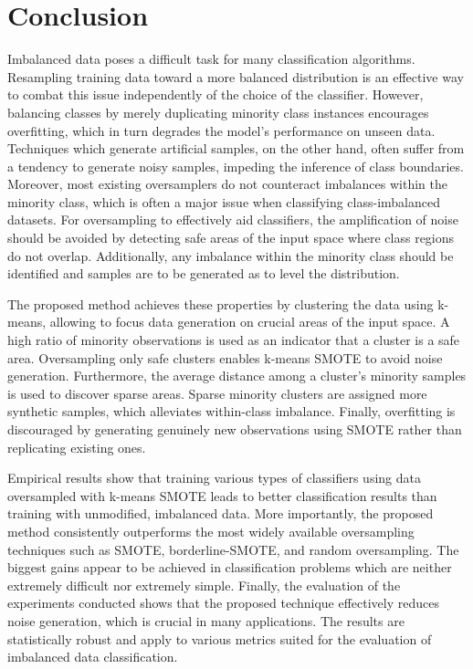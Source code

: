 \documentclass[sort&compress]{elsarticle}
\begin{document}
\section{Conclusion}
\label{sec:conclusion}
Imbalanced data poses a difficult task for many classification algorithms. Resampling training data toward a more balanced distribution is an effective way to combat this issue independently of the choice of the classifier. However, balancing classes by merely duplicating minority class instances encourages overfitting, which in turn degrades the model's performance on unseen data. Techniques which generate artificial samples, on the other hand, often suffer from a tendency to generate noisy samples, impeding the inference of class boundaries. Moreover, most existing oversamplers do not counteract imbalances within the minority class, which is often a major issue when classifying class-imbalanced datasets. For oversampling to effectively aid classifiers, the amplification of noise should be avoided by detecting safe areas of the input space where class regions do not overlap. Additionally, any imbalance within the minority class should be identified and samples are to be generated as to level the distribution.

The proposed method achieves these properties by clustering the data using k-means, allowing to focus data generation on crucial areas of the input space. A high ratio of minority observations is used as an indicator that a cluster is a safe area. Oversampling only safe clusters enables k-means \ac{SMOTE} to avoid noise generation. Furthermore, the average distance among a cluster's minority samples is used to discover sparse areas. Sparse minority clusters are assigned more synthetic samples, which alleviates within-class imbalance. Finally, overfitting is discouraged by generating genuinely new observations using \ac{SMOTE} rather than replicating existing ones.

Empirical results show that training various types of classifiers using data oversampled with k-means \ac{SMOTE} leads to better classification results than training with unmodified, imbalanced data. More importantly, the proposed method consistently outperforms the most widely available oversampling techniques such as \ac{SMOTE}, borderline-\ac{SMOTE}, and random oversampling. The biggest gains appear to be achieved in classification problems which are neither extremely difficult nor extremely simple. Finally, the evaluation of the experiments conducted shows that the proposed technique effectively reduces noise generation, which is crucial in many applications. The results are statistically robust and apply to various metrics suited for the evaluation of imbalanced data classification.
\end{document}
